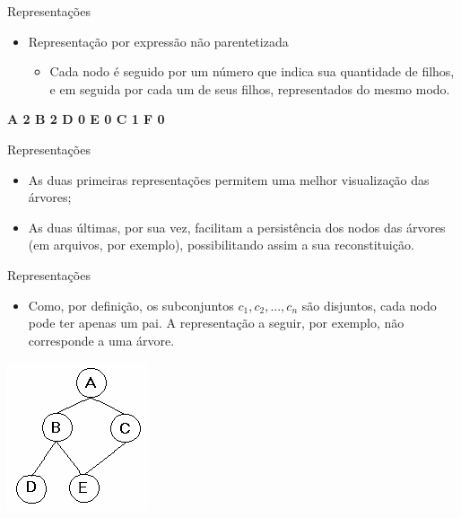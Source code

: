 \documentclass[12pt,table,xcolor={dvipsnames}]{beamer}
\begin{document}
\begin{frame}[fragile]{Representações}
\begin{itemize}
\item Representação por expressão	não parentetizada
\begin{itemize}
\item  Cada nodo é seguido por um número que indica sua quantidade de filhos, e em seguida por cada um de seus filhos, representados do mesmo modo.
\end{itemize}
\end{itemize}
\begin{center}
\textbf{A 2 B 2 D 0 E 0 C 1 F 0}
\end{center}
\end{frame}

\begin{frame}[fragile]{Representações}
\begin{itemize}
\item As duas primeiras representações permitem uma melhor visualização das árvores; 
\item As duas últimas, por sua vez, facilitam a persistência dos nodos das árvores (em arquivos, por exemplo), possibilitando assim a sua reconstituição.
\end{itemize}
\end{frame}

\begin{frame}[fragile]{Representações}
          \begin{itemize}
		  \item Como, por definição, os subconjuntos $c_1, c_2, ..., c_n$ são disjuntos, cada nodo pode ter apenas um pai. A representação a seguir, por exemplo, não corresponde a uma árvore.
          \end{itemize}
          \begin{center}
          \includegraphics[scale=.75]{grafo.png} 
          \end{center}
\end{frame} 
\end{document}

